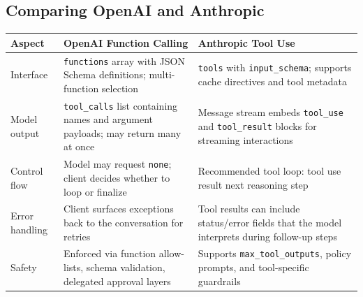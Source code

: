 \documentclass{article}
\begin{document}
\subsection{Comparing OpenAI and Anthropic}
\begin{longtable}{p{3.5cm}p{5cm}p{5cm}}
\toprule
Aspect & OpenAI Function Calling & Anthropic Tool Use \\
\midrule
Interface & \texttt{functions} array with JSON Schema definitions; multi-function selection & \texttt{tools} with \texttt{input\_schema}; supports cache directives and tool metadata \\
Model output & \texttt{tool\_calls} list containing names and argument payloads; may return many at once & Message stream embeds \texttt{tool\_use} and \texttt{tool\_result} blocks for streaming interactions \\
Control flow & Model may request \texttt{none}; client decides whether to loop or finalize & Recommended tool loop: tool use \textrightarrow{} result \textrightarrow{} next reasoning step \\
Error handling & Client surfaces exceptions back to the conversation for retries & Tool results can include status/error fields that the model interprets during follow-up steps \\
Safety & Enforced via function allow-lists, schema validation, delegated approval layers & Supports \texttt{max\_tool\_outputs}, policy prompts, and tool-specific guardrails \\
\bottomrule
\end{longtable}
\end{document}
